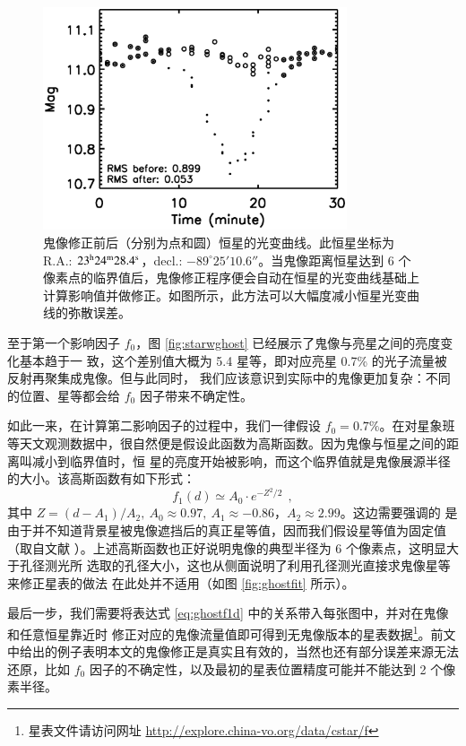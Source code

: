 \begin{figure}[ht!]
\centering
\includegraphics[width=0.8\textwidth, trim={0.5cm 0.3cm 0.5cm 0}]{figures/chapter2/f10_deghost.eps}
\caption{鬼像修正前后（分别为点和圆）恒星的光变曲线。此恒星坐标为 R.A.: $23^\mathrm{h}24^\mathrm{m}28.4^\mathrm{s}$，decl.: $-89^{\circ}25'10.6''$。当鬼像距离恒星达到 6 个像素点的临界值后，鬼像修正程序便会自动在恒星的光变曲线基础上计算影响值并做修正。如图所示，此方法可以大幅度减小恒星光变曲线的弥散误差。}
\label{fig:deghost}
\end{figure}


至于第一个影响因子 $f_0$，图 \ref{fig:starwghost} 已经展示了鬼像与亮星之间的亮度变化基本趋于一
致，这个差别值大概为 5.4 星等，即对应亮星 0.7\% 的光子流量被反射再聚集成鬼像。但与此同时，
我们应该意识到实际中的鬼像更加复杂：不同的位置、星等都会给 $f_0$ 因子带来不确定性。

如此一来，在计算第二影响因子的过程中，我们一律假设 $f_0 =  0.7\% $。在对星象班等天文观测数据中，很自然便是假设此函数为高斯函数。因为鬼像与恒星之间的距离叫减小到临界值时，恒
星的亮度开始被影响，而这个临界值就是鬼像展源半径的大小。该高斯函数有如下形式：
\begin{equation} \label{eq:ghostf1d}
f_1(d) \simeq A_0 \cdot e^{-Z^2/2} \ \ , 
\end{equation}
其中 $Z = (d-A_1)/A_2,\ A_0 \approx 0.97,\ A_1 \approx -0.86$，$A_2 \approx 2.99$。这边需要强调的
是由于并不知道背景星被鬼像遮挡后的真正星等值，因而我们假设星等值为固定值（取自文献 
）。上述高斯函数也正好说明鬼像的典型半径为 6 个像素点，这明显大于孔径测光所
选取的孔径大小\cite{ZhouX2010b}，这也从侧面说明了利用孔径测光直接求鬼像星等来修正星表的做法
在此处并不适用（如图 \ref{fig:ghostfit} 所示）。

最后一步，我们需要将表达式 \ref{eq:ghostf1d} 中的关系带入每张图中，并对在鬼像和任意恒星靠近时
修正对应的鬼像流量值即可得到无鬼像版本的星表数据\footnote{星表文件请访问网址 \url{http://explore.china-vo.org/data/cstar/f}}。前文中给出的例子表明本文的鬼像修正是真实且有效的，当然也还有部分误差来源无法还原，比如 $f_0$ 因子的不确定性，以及最初的星表位置精度可能并不能达到 2 个像素半径。

